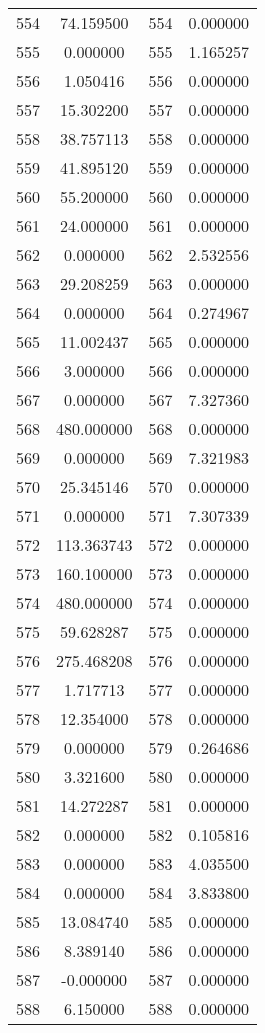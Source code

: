 \documentclass[12pt]{article}
\begin{document}
\begin{longtable}{@{}cccc@{}}
554 & 74.159500 & 554 & 0.000000 \\
555 & 0.000000 & 555 & 1.165257 \\
556 & 1.050416 & 556 & 0.000000 \\
557 & 15.302200 & 557 & 0.000000 \\
558 & 38.757113 & 558 & 0.000000 \\
559 & 41.895120 & 559 & 0.000000 \\
560 & 55.200000 & 560 & 0.000000 \\
561 & 24.000000 & 561 & 0.000000 \\
562 & 0.000000 & 562 & 2.532556 \\
563 & 29.208259 & 563 & 0.000000 \\
564 & 0.000000 & 564 & 0.274967 \\
565 & 11.002437 & 565 & 0.000000 \\
566 & 3.000000 & 566 & 0.000000 \\
567 & 0.000000 & 567 & 7.327360 \\
568 & 480.000000 & 568 & 0.000000 \\
569 & 0.000000 & 569 & 7.321983 \\
570 & 25.345146 & 570 & 0.000000 \\
571 & 0.000000 & 571 & 7.307339 \\
572 & 113.363743 & 572 & 0.000000 \\
573 & 160.100000 & 573 & 0.000000 \\
574 & 480.000000 & 574 & 0.000000 \\
575 & 59.628287 & 575 & 0.000000 \\
576 & 275.468208 & 576 & 0.000000 \\
577 & 1.717713 & 577 & 0.000000 \\
578 & 12.354000 & 578 & 0.000000 \\
579 & 0.000000 & 579 & 0.264686 \\
580 & 3.321600 & 580 & 0.000000 \\
581 & 14.272287 & 581 & 0.000000 \\
582 & 0.000000 & 582 & 0.105816 \\
583 & 0.000000 & 583 & 4.035500 \\
584 & 0.000000 & 584 & 3.833800 \\
585 & 13.084740 & 585 & 0.000000 \\
586 & 8.389140 & 586 & 0.000000 \\
587 & -0.000000 & 587 & 0.000000 \\
588 & 6.150000 & 588 & 0.000000 \\

\end{longtable}
\end{document}

